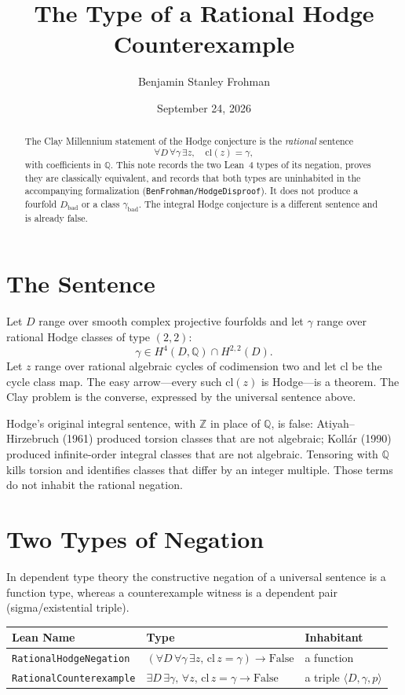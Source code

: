 \documentclass[11pt]{amsart}
\title{The Type of a Rational Hodge Counterexample}
\author{Benjamin Stanley Frohman}
\date{September 24, 2026}
\begin{document}
\begin{abstract}
The Clay Millennium statement of the Hodge conjecture is the \emph{rational} sentence
\[
  \forall D\,\forall\gamma\,\exists z,\quad \mathrm{cl}(z)=\gamma,
\]
with coefficients in $\mathbb{Q}$. This note records the two Lean~4 types of its negation, proves they are classically equivalent, and records that both types are uninhabited in the accompanying formalization (\texttt{BenFrohman/HodgeDisproof}). It does not produce a fourfold $D_{\mathrm{bad}}$ or a class $\gamma_{\mathrm{bad}}$. The integral Hodge conjecture is a different sentence and is already false.
\end{abstract}

\maketitle

\section{The Sentence}

Let $D$ range over smooth complex projective fourfolds and let $\gamma$ range over rational Hodge classes of type $(2,2)$:
\[
  \gamma\in H^4(D,\mathbb{Q})\cap H^{2,2}(D).
\]
Let $z$ range over rational algebraic cycles of codimension two and let $\mathrm{cl}$ be the cycle class map. The easy arrow---every such $\mathrm{cl}(z)$ is Hodge---is a theorem. The Clay problem is the converse, expressed by the universal sentence above.

Hodge's original integral sentence, with $\mathbb{Z}$ in place of $\mathbb{Q}$, is false: Atiyah--Hirzebruch (1961) produced torsion classes that are not algebraic; Koll\'ar (1990) produced infinite-order integral classes that are not algebraic. Tensoring with $\mathbb{Q}$ kills torsion and identifies classes that differ by an integer multiple. Those terms do not inhabit the rational negation.

\section{Two Types of Negation}

In dependent type theory the constructive negation of a universal sentence is a function type, whereas a counterexample witness is a dependent pair (sigma/existential triple).

\begin{center}
\renewcommand{\arraystretch}{1.25}
\begin{tabular}{@{}lll@{}}
\toprule
\textbf{Lean Name} & \textbf{Type} & \textbf{Inhabitant} \\
\midrule
\texttt{RationalHodgeNegation} & $(\forall D\,\forall\gamma\,\exists z,\,\mathrm{cl}\,z=\gamma)\to\mathrm{False}$ & a function \\
\texttt{RationalCounterexample} & $\exists D\,\exists\gamma,\,\forall z,\,\mathrm{cl}\,z=\gamma\to\mathrm{False}$ & a triple $\langle D,\gamma,p\rangle$ \\
\bottomrule
\end{tabular}
\end{center}
\end{document}
